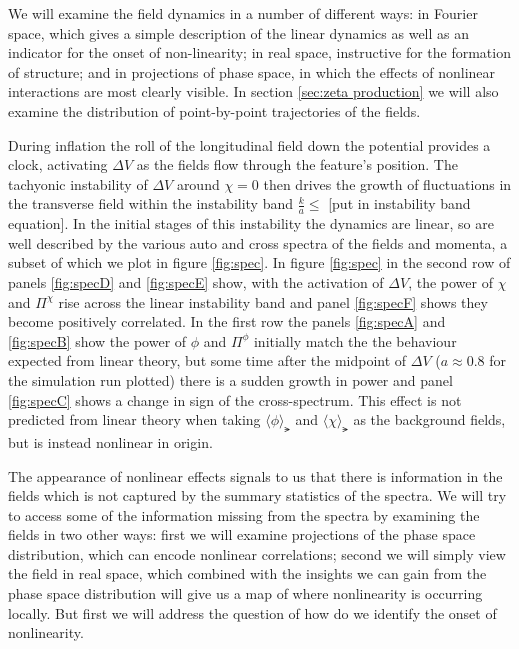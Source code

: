 

We will examine the field dynamics in a number of different ways:
in Fourier space, which gives a simple description of the linear dynamics as well as an indicator for the onset of non-linearity;
in real space, instructive for the formation of structure;
and in projections of phase space, in which the effects of nonlinear interactions are most clearly visible. 
In section \ref{sec:zeta production} we will also examine the distribution of point-by-point trajectories of the fields.

During inflation the roll of the longitudinal field down the potential provides a clock, activating $\Delta V$ as the fields flow through the feature's position.
The tachyonic instability of $\Delta V$ around $\chi=0$ then drives the growth of fluctuations in the transverse field within the instability band $\frac{k}{a} \leq $ [put in instability band equation].
In the initial stages of this instability the dynamics are linear, so are well described by the various auto and cross spectra of the fields and momenta, a subset of which we plot in figure \ref{fig:spec}.
In figure \ref{fig:spec} in the second row of panels \ref{fig:specD} and \ref{fig:specE} show, with the activation of $\Delta V$, the power of $\chi$ and $\Pi^\chi$ rise across the linear instability band and panel \ref{fig:specF} shows they become positively correlated.
In the first row the panels \ref{fig:specA} and \ref{fig:specB} show the power of $\phi$ and $\Pi^\phi$ initially match the the behaviour expected from linear theory, but some time after the midpoint of $\Delta V$ ($a \approx 0.8$ for the simulation run plotted) there is a sudden growth in power and panel \ref{fig:specC} shows a change in sign of the cross-spectrum.
This effect is not predicted from linear theory when taking $\langle \phi \rangle_\lat$ and $\langle \chi \rangle_\lat$ as the background fields, but is instead nonlinear in origin.

\Fspec

\Fspecdet

The appearance of nonlinear effects signals to us that there is information in the fields which is not captured by the summary statistics of the spectra.
We will try to access some of the information missing from the spectra by examining the fields in two other ways: first we will examine projections of the phase space distribution, which can encode nonlinear correlations; second we will simply view the field in real space, which combined with the insights we can gain from the phase space distribution will give us a map of where nonlinearity is occurring locally.
But first we will address the question of how do we identify the onset of nonlinearity.

